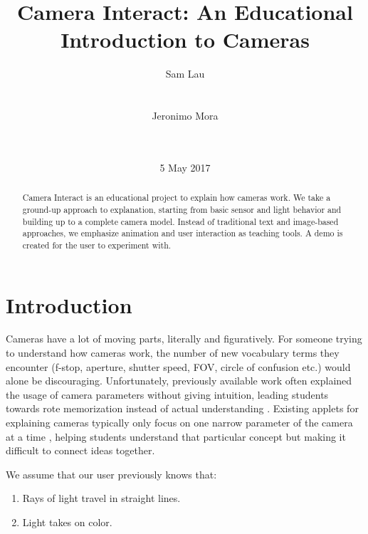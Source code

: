 \documentclass{acm_proc_article-sp}
\begin{document}
\title{Camera Interact: An Educational Introduction to Cameras}

\author{
\alignauthor
Sam Lau\\
       \\
       \\
\alignauthor
Jeronimo Mora\\
       \\
       \\
}

\date{5 May 2017}


\maketitle
\begin{abstract}
Camera Interact is an educational project to explain how cameras work. We take a ground-up approach to explanation, starting from basic sensor and light behavior and building up to a complete camera model. Instead of traditional text and image-based approaches, we emphasize animation and user interaction as teaching tools. A demo is created for the user to experiment with.
\end{abstract}


\section{Introduction}
Cameras have a lot of moving parts, literally and figuratively. For someone
trying to understand how cameras work, the number of new vocabulary terms they
encounter (f-stop, aperture, shutter speed, FOV, circle of confusion etc.)
would alone be discouraging. Unfortunately, previously available work often
explained the usage of camera parameters without giving intuition, leading
students towards rote memorization instead of actual understanding
\cite{robertsinteract}. Existing applets for explaining cameras typically only
focus on one narrow parameter of the camera at a time \cite{stanfordinteract},
helping students understand that particular concept but making it difficult to
connect ideas together.

We assume that our user previously knows that:

\begin{enumerate}
  \item Rays of light travel in straight lines.
  \item Light takes on color.
\end{enumerate}
\end{document}
